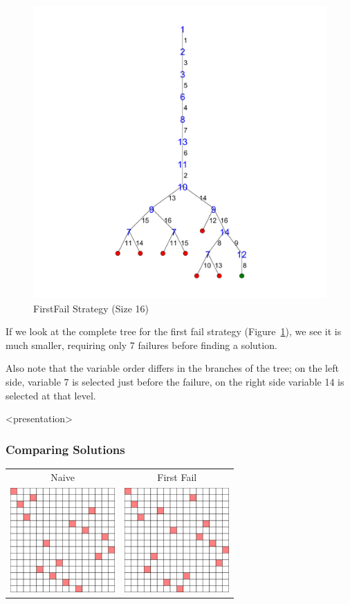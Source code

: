 \begin{figure}[h]
\caption{\label{nqueen:firstfailtree}FirstFail Strategy (Size 16)}
\begin{center}
\includegraphics[width=12cm]{../nqueen/first_fail/tree_expanded_23}
\end{center}
\end{figure}

If we look at the complete tree for the first fail strategy (Figure~\ref{nqueen:firstfailtree}), we see it is much smaller, requiring only 7 failures before finding a solution. 

Also note that the variable order differs in the branches of the tree; on the left side, variable 7 is selected just before the failure, on the right side variable 14 is selected at that level.
 
\begin{frame}<presentation>
\frametitle{Comparing Solutions}
\begin{tabular}{cc}
Naive & First Fail \\
\includegraphics[width=4cm]{../nqueen/naive/frame2959}
&
\includegraphics[width=4cm]{../nqueen/first_fail/frame24}
\end{tabular}

\end{frame}

